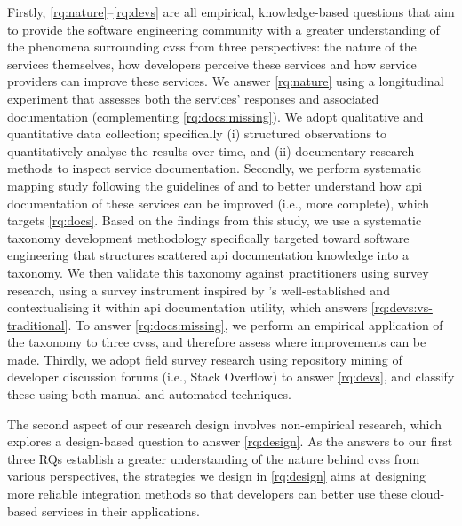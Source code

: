 Firstly, \ref{rq:nature}--\ref{rq:devs} are all empirical, knowledge-based questions \citep{Easterbrook:2007ws,Meltzoff:1998wg} that aim to provide the software engineering community with a greater understanding of the phenomena surrounding \glspl{cvs} from three perspectives: the nature of the services themselves, how developers perceive these services and how service providers can improve these services.  We answer \ref{rq:nature} using a longitudinal experiment that assesses both the services' responses and associated documentation (complementing \ref{rq:docs:missing}). We adopt qualitative and quantitative data collection; specifically (i) structured observations to quantitatively analyse the results over time, and (ii) documentary research methods to inspect service documentation.
Secondly, we perform systematic mapping study following the guidelines of \citet{Kitchenham:2007dd} and \citet{Petersen:2008td} to better understand how \gls{api} documentation of these services can be improved (i.e., more complete), which targets \ref{rq:docs}. Based on the findings from this study, we use a systematic taxonomy development methodology specifically targeted toward software engineering \citep{Usman:2017hn} that structures scattered \gls{api} documentation knowledge into a taxonomy. We then validate this taxonomy against practitioners using survey research, using a survey instrument inspired by \citeauthor{Brooke:1996ua}'s well-established  \citep{Brooke:1996ua}  and contextualising it within \gls{api} documentation utility, which answers \ref{rq:devs:vs-traditional}. To answer \ref{rq:docs:missing}, we perform an empirical application of the taxonomy to three \glspl{cvs}, and therefore assess where improvements can be made.
Thirdly, we adopt field survey research using repository mining of developer discussion forums (i.e., Stack Overflow) to answer \ref{rq:devs}, and classify these using both manual and automated techniques.

The second aspect of our research design involves non-empirical research, which explores a design-based question \citep{Simon:1996uw} to answer \ref{rq:design}. As the answers to our first three RQs establish a greater understanding of the nature behind \glspl{cvs} from various perspectives, the strategies we design in \ref{rq:design} aims at designing more reliable integration methods so that developers can better use these cloud-based services in their applications.